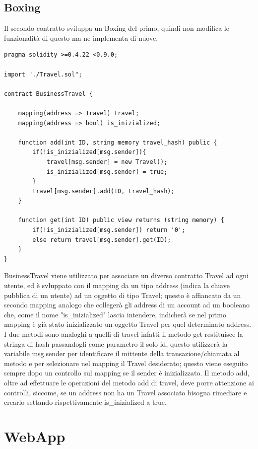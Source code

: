 \documentclass[11pt,a4paper,titlepage]{report}
\begin{document}
\subsection{Boxing}
Il secondo contratto sviluppa un Boxing del primo, quindi non modifica le funzionalità di questo ma ne implementa di nuove.
\begin{lstlisting}[language=Solidity]
pragma solidity >=0.4.22 <0.9.0;

import "./Travel.sol";

contract BusinessTravel {

    mapping(address => Travel) travel;
    mapping(address => bool) is_inizialized;

    function add(int ID, string memory travel_hash) public {
        if(!is_inizialized[msg.sender]){
            travel[msg.sender] = new Travel();
            is_inizialized[msg.sender] = true;
        } 
        travel[msg.sender].add(ID, travel_hash);
    }

    function get(int ID) public view returns (string memory) {
        if(!is_inizialized[msg.sender]) return '0';
        else return travel[msg.sender].get(ID);
    }
}
\end{lstlisting}

BusinessTravel viene utilizzato per associare un diverso contratto Travel ad ogni utente, ed è svluppato con il mapping da un tipo address (indica la chiave pubblica di un utente) ad un oggetto di tipo Travel; questo è affiancato da un secondo mapping analogo che collegerà gli address di un account ad un booleano che, come il nome "is\_inizialized" lascia intendere, indicherà se nel primo mapping è già stato inizializzato un oggetto Travel per quel determinato address. I due metodi sono analoghi a quelli di travel infatti il metodo get restituisce la stringa di hash passandogli come parametro il solo id, questo utilizzerà la variabile msg.sender per identificare il mittente della transazione/chiamata al metodo e per selezionare nel mapping il Travel desiderato; questo viene eseguito sempre dopo un controllo sul mapping se il sender è inizializzato. Il metodo add, oltre ad effettuare le operazioni del metodo add di travel, deve porre attenzione ai controlli, siccome, se un address non ha un Travel associato bisogna rimediare e crearlo settando rispettivamente is\_inizialized a true.

\section{WebApp}
\end{document}
